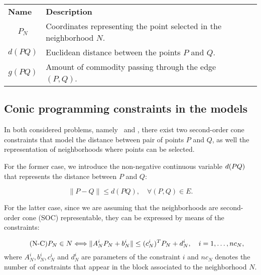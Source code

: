 \documentclass[a4paper]{elsarticle}
\newcommand{\SPPN}{{\sf{H-SPPN}\xspace }}
\newcommand{\TSPN}{{\sf{H-TSPN}\xspace }}
\begin{document}
\begin{table}[h!]
\begin{tabular}{|cl|l}
				\multicolumn{1}{|l|}{\textbf{Name}} & \textbf{Description} &  \\ \cline{1-2}
				\multicolumn{1}{|c|}{$P_N$} & Coordinates representing the point selected in the neighborhood $N$. &  \\ \cline{1-2}
				\multicolumn{1}{|c|}{$d(PQ)$} & Euclidean distance between the points $P$ and $Q$. &  \\ \cline{1-2}
				\multicolumn{1}{|c|}{$g(PQ)$} & Amount of commodity passing through the edge $(P, Q)$. &  \\ \cline{1-2}
			\end{tabular}
		\end{table}
	
		\subsection{Conic programming constraints in the models}
	In both considered  problems, namely \SPPN \ and \TSPN, there exist two second-order cone constraints that model the distance between  pair of points $P$ and $Q$, as well the representation of neighborhoods where points can be selected.
	
	\newcommand{\dvar}[2]{d(#1#2)}
	
	For the former case, we introduce the non-negative continuous variable $\dvar{PQ}$ that represents the distance between $P$ and $Q$:
	
	
	\begin{equation*}\tag{d-C}\label{eq:dC}
		\|P - Q\|\leq \dvar{P}{Q},\quad\forall (P,Q)\in E.
	\end{equation*}
	
	For the latter case, since we are assuming that the neighborhoods are second-order cone (SOC) representable, they can be expressed by means of the constraints:
	
	\begin{equation*}\tag{N-C}\label{eq:nC}
		P_N\in N \Longleftrightarrow
		\|A_N^i P_N + b_N^i\| \leq (c_N^i)^T P_N + d_N^i,\quad i=1,\ldots,nc_N, \\
	\end{equation*}
	where $A_N^i, b_N^i, c_N^i$ and $d_N^i$ are parameters of the constraint $i$ and $nc_N$ denotes the number of constraints that appear in the block associated to the neighborhood $N$.
	
\end{document}
